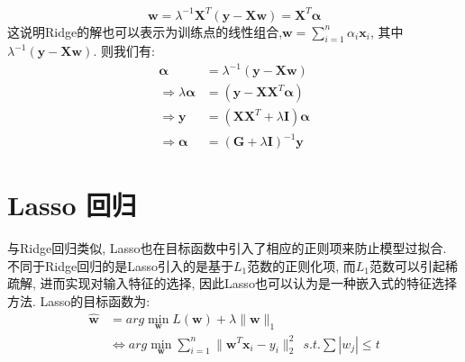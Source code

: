 \begin{equation}
\boldsymbol{w}=\lambda ^{-1}\mathbf{X}^T\left( \mathbf{y}-\mathbf{X}\boldsymbol{w} \right) =\mathbf{X}^T\boldsymbol{\alpha }
\end{equation}
这说明Ridge的解也可以表示为训练点的线性组合,$\boldsymbol{w}=\sum_{i=1}^n{\alpha _i\boldsymbol{x}_i}$, 其中$\lambda ^{-1}\left( \mathbf{y}-\mathbf{X}\boldsymbol{w} \right) $. 则我们有: 
\begin{equation}
\begin{aligned}
\boldsymbol{\alpha }&=\lambda ^{-1}\left( \mathbf{y}-\mathbf{X}\boldsymbol{w} \right)  \\
\Rightarrow \lambda \boldsymbol{\alpha }&=\left( \mathbf{y}-\mathbf{XX}^T\boldsymbol{\alpha } \right) \\
\Rightarrow \mathbf{y}&=\left( \mathbf{XX}^T+\lambda \mathbf{I} \right) \boldsymbol{\alpha }\\
\Rightarrow \boldsymbol{\alpha }&=\left( \mathbf{G}+\lambda \mathbf{I} \right) ^{-1}\mathbf{y}
\end{aligned}
\end{equation}
\section{Lasso 回归}
与Ridge回归类似, Lasso也在目标函数中引入了相应的正则项来防止模型过拟合. 不同于Ridge回归的是Lasso引入的是基于$L_1$范数的正则化项, 而$L_1$范数可以引起稀疏解, 进而实现对输入特征的选择, 因此Lasso也可以认为是一种嵌入式的特征选择方法. Lasso的目标函数为:
\begin{equation}
\begin{aligned}
\boldsymbol{\hat{w}}&=arg\underset{\boldsymbol{w}}{\min}L\left( \boldsymbol{w} \right) +\lambda \lVert \boldsymbol{w} \rVert_1\\
&\Longleftrightarrow arg\underset{\boldsymbol{w}}{\min}\sum_{i=1}^n{\lVert \boldsymbol{w}^T\boldsymbol{x}_i-y_i \rVert _{2}^{2}}  \ \  s.t. \sum{\left| w_j \right|}\le t  \label{con:lasso1}
\end{aligned}
\end{equation}
